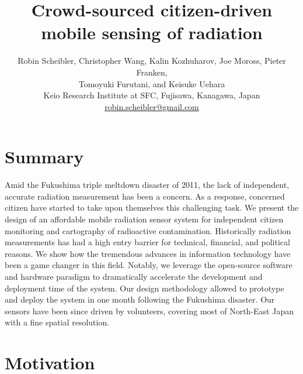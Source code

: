 \documentclass[11pt]{article}
\newcommand*{\TitleFont}{%
  \Large\usefont{T1}{phv}{b}{n}%
    \selectfont}
\newcommand*{\AuthorFont}{%
  \normalsize\usefont{T1}{\rmdefault}{m}{n}%
    \selectfont}
\begin{document}
%
\title{\TitleFont Crowd-sourced citizen-driven mobile sensing of radiation}



\author{
  \AuthorFont Robin Scheibler, Christopher Wang, Kalin Kozhuharov, Joe Moross, Pieter Franken, \\
  \AuthorFont Tomoyuki Furutani, and Keisuke Uehara \\
  \AuthorFont Keio Research Institute at SFC, Fujisawa, Kanagawa, Japan \\
  \AuthorFont \url{robin.scheibler@gmail.com}
}

\date{}

\maketitle

\thispagestyle{empty}
\pagestyle{empty}

\section*{Summary}
\label{sec:abstract}

Amid the Fukushima triple meltdown disaster of 2011, the lack of independent,
accurate radiation measurement has been a concern. As a response, concerned
citizen have started to take upon themselves this challenging task.
We present the design of an affordable mobile radiation sensor system for
independent citizen monitoring and cartography of radioactive contamination.
Historically radiation measurements has had a high entry barrier for technical,
financial, and political reasons. We show how the tremendous advances in
information technology have been a game changer in this field. Notably, we
leverage the open-source software and hardware paradigm to dramatically
accelerate the development and deployment time of the system.
Our design methodology allowed to prototype and deploy the system in one
month following the Fukushima disaster. Our sensors have been since driven by
volunteers, covering most of North-East Japan with a fine spatial resolution.

\section*{Motivation}
\label{sec:motivation}
\end{document}
